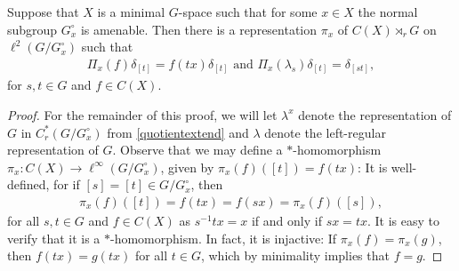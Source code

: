 \begin{lemma}
	Suppose that $X$ is a minimal $G$-space such that for some $x \in X$ the normal subgroup $G_x^\circ$ is amenable. Then there is a representation $\pi_x$ of $C(X) \rtimes_r G$ on $\ell^2(G/G_x^\circ)$ such that
	\begin{align*}
		\Pi_x(f)\delta_{[t]} = f(tx)\delta_{[t]} \text{  and  } \Pi_x(\lambda_s)\delta_{[t]} = \delta_{[st]},
	\end{align*}
	for $s,t \in G$ and $f \in C(X)$.
	\label{CXGrep}
\end{lemma}
\begin{proof}
	For the remainder of this proof, we will let $\lambda^x$ denote the representation of $G$ in $C_r^*(G/G_x^\circ)$ from \cref{quotientextend} and $\lambda$ denote the left-regular representation of $G$. Observe that we may define a $*$-homomorphism $\pi_x \colon C(X) \to \ell^\infty(G/G_x^\circ)$, given by $\pi_x(f)([t])=f(tx)$: It is well-defined, for if $[s]=[t] \in G/G_x^\circ$, then 
	\begin{align*}
		\pi_x(f)([t])=f(tx) = f(sx) = \pi_x(f)([s]),
	\end{align*}
	for all $s,t \in G$ and $f \in C(X)$ as $s^{-1}tx = x$ if and only if $sx=tx$. It is easy to verify that it is a $*$-homomorphism. In fact, it is injactive: If $\pi_x(f) = \pi_x(g)$, then $f(tx)=g(tx)$ for all $t \in G$, which by minimality implies that $f=g$.
	

\end{proof}
